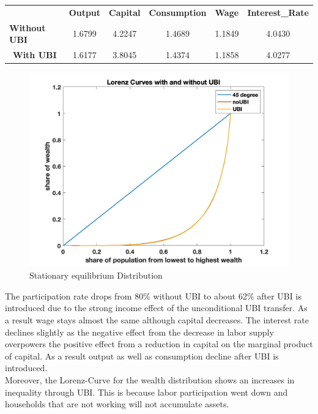 \documentclass[letterpaper,12pt]{article}
\begin{document}
\begin{table}
\begin{tabular}{@{}lccccc@{}}
\textbf{}                             & \multicolumn{1}{l}{\textbf{Output}} & \multicolumn{1}{l}{\textbf{Capital}} & \multicolumn{1}{l}{\textbf{Consumption}} & \multicolumn{1}{l}{\textbf{Wage}} & \multicolumn{1}{l}{\textbf{Interest\_Rate}} \\ \cmidrule(l){2-6} 
\textbf{Without UBI}                  & 1.6799                              & 4.2247                               & 1.4689                                   & 1.1849                            & 4.0430                                      \\
\multicolumn{1}{c}{\textbf{With UBI}} & 1.6177                              & 3.8045                               & 1.4374                                   & 1.1858                            & 4.0277                                     
\end{tabular}
\end{table}

\begin{figure}
\includegraphics[scale=0.5]{Figures/Part2_UBI/Lorenz_UBI_vs_noUBI}
\caption{Stationary equilibrium Distribution}
\end{figure}

The participation rate drops from 80\% without UBI to about 62\% after UBI is introduced due to the strong income effect of the unconditional UBI transfer. As a result wage stays almost the same although capital decreases. The interest rate declines slightly as the negative effect from the decrease in labor supply overpowers the positive effect from a reduction in capital on the marginal product of capital. As a result output as well as consumption decline after UBI is introduced. \\
Moreover, the Lorenz-Curve for the wealth distribution shows an increases in inequality through UBI. This is because labor participation went down and households that are not working will not accumulate assets. 
\end{document}
